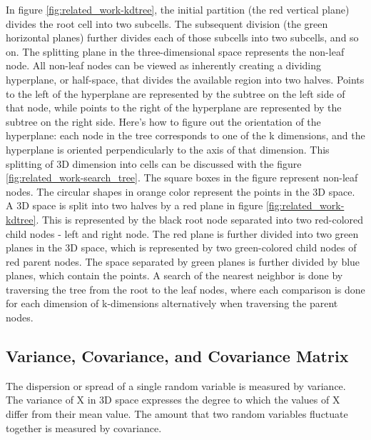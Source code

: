 In figure \ref{fig:related_work-kdtree}, the initial partition (the red vertical plane) divides the root cell into two subcells. The subsequent division (the green horizontal planes) further divides each of those subcells into two subcells, and so on. The splitting plane in the three-dimensional space represents the non-leaf node. All non-leaf nodes can be viewed as inherently creating a dividing hyperplane, or half-space, that divides the available region into two halves. Points to the left of the hyperplane are represented by the subtree on the left side of that node, while points to the right of the hyperplane are represented by the subtree on the right side. Here's how to figure out the orientation of the hyperplane: each node in the tree corresponds to one of the k dimensions, and the hyperplane is oriented perpendicularly to the axis of that dimension. This splitting of 3D dimension into cells can be discussed with the figure \ref{fig:related_work-search_tree}. The square boxes in the figure represent non-leaf nodes. The circular shapes in orange color represent the points in the 3D space. A 3D space is split into two halves by a red plane in figure \ref{fig:related_work-kdtree}. This is represented by the black root node separated into two red-colored child nodes - left and right node. The red plane is further divided into two green planes in the 3D space, which is represented by two green-colored child nodes of red parent nodes. The space separated by green planes is further divided by blue planes, which contain the points. A search of the nearest neighbor is done by traversing the tree from the root to the leaf nodes, where each comparison is done for each dimension of k-dimensions alternatively when traversing the parent nodes.

\subsection{Variance, Covariance, and Covariance Matrix}
The dispersion or spread of a single random variable is measured by variance. The variance of X in 3D space expresses the degree to which the values of X differ from their mean value. The amount that two random variables fluctuate together is measured by covariance. 

